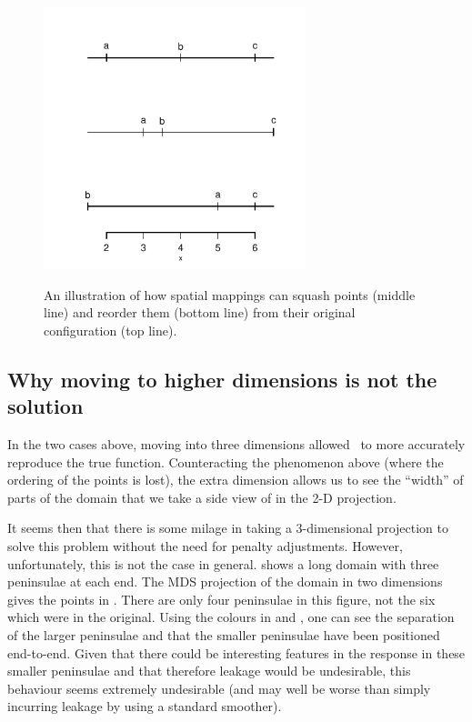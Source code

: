 \begin{figure}
\centering
\includegraphics[width=3in]{mds/figs/linedia.pdf} \\
\caption{An illustration of how spatial mappings can squash points (middle line) and reorder them (bottom line) from their original configuration (top line).}
\label{linedia}
\end{figure}

\subsection{Why moving to higher dimensions is not the solution}
\label{nohigherdim}

In the two cases above, moving into three dimensions allowed \mdsap\ to more accurately reproduce the true function. Counteracting the phenomenon above (where the ordering of the points is lost), the extra dimension allows us to see the ``width'' of parts of the domain that we take a side view of in the 2-D projection.

It seems then that there is some milage in taking a 3-dimensional projection to solve this problem without the need for penalty adjustments. However, unfortunately, this is not the case in general.  shows a long domain with three peninsulae at each end. The MDS projection of the domain in two dimensions gives the points in . There are only four peninsulae in this figure, not the six which were in the original. Using the colours in  and , one can see the separation of the larger peninsulae and that the smaller peninsulae have been positioned end-to-end. Given that there could be interesting features in the response in these smaller peninsulae and that therefore leakage would be undesirable, this behaviour seems extremely undesirable (and may well be worse than simply incurring leakage by using a standard smoother).

